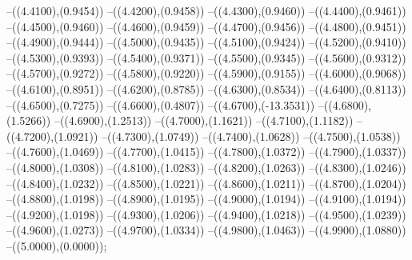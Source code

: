 {	--({\sx*(4.4100)},{\sy*(0.9454)})
	--({\sx*(4.4200)},{\sy*(0.9458)})
	--({\sx*(4.4300)},{\sy*(0.9460)})
	--({\sx*(4.4400)},{\sy*(0.9461)})
	--({\sx*(4.4500)},{\sy*(0.9460)})
	--({\sx*(4.4600)},{\sy*(0.9459)})
	--({\sx*(4.4700)},{\sy*(0.9456)})
	--({\sx*(4.4800)},{\sy*(0.9451)})
	--({\sx*(4.4900)},{\sy*(0.9444)})
	--({\sx*(4.5000)},{\sy*(0.9435)})
	--({\sx*(4.5100)},{\sy*(0.9424)})
	--({\sx*(4.5200)},{\sy*(0.9410)})
	--({\sx*(4.5300)},{\sy*(0.9393)})
	--({\sx*(4.5400)},{\sy*(0.9371)})
	--({\sx*(4.5500)},{\sy*(0.9345)})
	--({\sx*(4.5600)},{\sy*(0.9312)})
	--({\sx*(4.5700)},{\sy*(0.9272)})
	--({\sx*(4.5800)},{\sy*(0.9220)})
	--({\sx*(4.5900)},{\sy*(0.9155)})
	--({\sx*(4.6000)},{\sy*(0.9068)})
	--({\sx*(4.6100)},{\sy*(0.8951)})
	--({\sx*(4.6200)},{\sy*(0.8785)})
	--({\sx*(4.6300)},{\sy*(0.8534)})
	--({\sx*(4.6400)},{\sy*(0.8113)})
	--({\sx*(4.6500)},{\sy*(0.7275)})
	--({\sx*(4.6600)},{\sy*(0.4807)})
	--({\sx*(4.6700)},{\sy*(-13.3531)})
	--({\sx*(4.6800)},{\sy*(1.5266)})
	--({\sx*(4.6900)},{\sy*(1.2513)})
	--({\sx*(4.7000)},{\sy*(1.1621)})
	--({\sx*(4.7100)},{\sy*(1.1182)})
	--({\sx*(4.7200)},{\sy*(1.0921)})
	--({\sx*(4.7300)},{\sy*(1.0749)})
	--({\sx*(4.7400)},{\sy*(1.0628)})
	--({\sx*(4.7500)},{\sy*(1.0538)})
	--({\sx*(4.7600)},{\sy*(1.0469)})
	--({\sx*(4.7700)},{\sy*(1.0415)})
	--({\sx*(4.7800)},{\sy*(1.0372)})
	--({\sx*(4.7900)},{\sy*(1.0337)})
	--({\sx*(4.8000)},{\sy*(1.0308)})
	--({\sx*(4.8100)},{\sy*(1.0283)})
	--({\sx*(4.8200)},{\sy*(1.0263)})
	--({\sx*(4.8300)},{\sy*(1.0246)})
	--({\sx*(4.8400)},{\sy*(1.0232)})
	--({\sx*(4.8500)},{\sy*(1.0221)})
	--({\sx*(4.8600)},{\sy*(1.0211)})
	--({\sx*(4.8700)},{\sy*(1.0204)})
	--({\sx*(4.8800)},{\sy*(1.0198)})
	--({\sx*(4.8900)},{\sy*(1.0195)})
	--({\sx*(4.9000)},{\sy*(1.0194)})
	--({\sx*(4.9100)},{\sy*(1.0194)})
	--({\sx*(4.9200)},{\sy*(1.0198)})
	--({\sx*(4.9300)},{\sy*(1.0206)})
	--({\sx*(4.9400)},{\sy*(1.0218)})
	--({\sx*(4.9500)},{\sy*(1.0239)})
	--({\sx*(4.9600)},{\sy*(1.0273)})
	--({\sx*(4.9700)},{\sy*(1.0334)})
	--({\sx*(4.9800)},{\sy*(1.0463)})
	--({\sx*(4.9900)},{\sy*(1.0880)})
	--({\sx*(5.0000)},{\sy*(0.0000)});
}
\def\xwerted{
\fill[color=red] (0.0000,0) circle[radius={0.07/\skala}];
\fill[color=white] (0.0000,0) circle[radius={0.05/\skala}];
\fill[color=red] (0.1903,0) circle[radius={0.07/\skala}];
\fill[color=white] (0.1903,0) circle[radius={0.05/\skala}];
\fill[color=red] (0.7322,0) circle[radius={0.07/\skala}];
\fill[color=white] (0.7322,0) circle[radius={0.05/\skala}];
\fill[color=red] (1.5433,0) circle[radius={0.07/\skala}];
\fill[color=white] (1.5433,0) circle[radius={0.05/\skala}];
\fill[color=red] (2.5000,0) circle[radius={0.07/\skala}];
\fill[color=white] (2.5000,0) circle[radius={0.05/\skala}];
\fill[color=red] (3.4567,0) circle[radius={0.07/\skala}];
\fill[color=white] (3.4567,0) circle[radius={0.05/\skala}];
\fill[color=red] (4.2678,0) circle[radius={0.07/\skala}];
\fill[color=white] (4.2678,0) circle[radius={0.05/\skala}];
\fill[color=red] (4.8097,0) circle[radius={0.07/\skala}];
\fill[color=white] (4.8097,0) circle[radius={0.05/\skala}];
\fill[color=red] (5.0000,0) circle[radius={0.07/\skala}];
\fill[color=white] (5.0000,0) circle[radius={0.05/\skala}];
}
